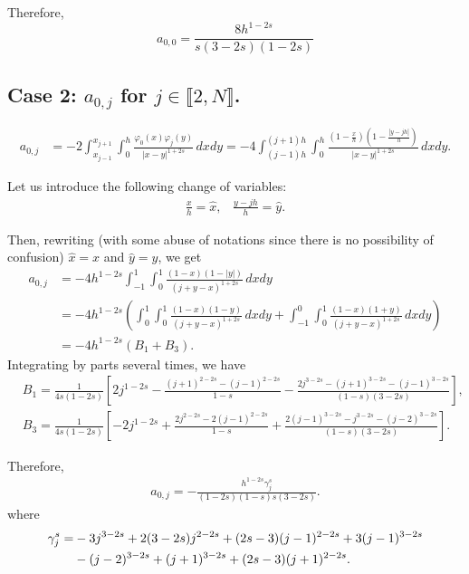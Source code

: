 \documentclass[11 pt]{article}
\newcommand\inter[1]{\llbracket #1\rrbracket}
\numberwithin{equation}{section}
\begin{document}
Therefore,
%
\begin{equation*}
    a_{0,0}=\frac{8 h^{1 - 2 s}}{s (3 - 2 s) (1 - 2 s)}
\end{equation*}
%

\subsection{Case 2: $a_{0,j}$ for $j\in\inter{2,N}$.}

\begin{align*}
	a_{0,j}&=-2 \int_{x_{j-1}}^{x_{j+1}}\int_{0}^{h}\frac{\varphi_0(x)\varphi_j(y)}{|x-y|^{1+2s}}\,dxdy
=-4 \int_{(j-1)h}^{(j+1)h}\int_0^{h}\frac{\left(1-\frac{x}{h}\right)\left(1-\frac{|y-jh|}{h}\right)}{|x-y|^{1+2s}}\,dxdy.
\end{align*}

Let us introduce the following change of variables:
\begin{align*}
	\frac{x}{h}=\hat{x},\;\;\; \frac{y-jh}{h}=\hat{y}.
\end{align*}

Then, rewriting (with some abuse of notations since there is no possibility of confusion) $\hat{x}=x$ and $\hat{y}=y$, we get 
\begin{align}\label{elem_noint_cv}
	a_{0,j}&=-4h^{1-2s} \int_{-1}^1\int_{0}^1\frac{(1-x)(1-|y|)}{(j+y-x)^{1+2s}}\,dxdy\\
	&=-4h^{1-2s} \left(\int_{0}^1\int_{0}^1\frac{(1-x)(1-y)}{(j+y-x)^{1+2s}}\,dxdy
	+\int_{-1}^0\int_{0}^1\frac{(1-x)(1+y)}{(j+y-x)^{1+2s}}\,dxdy\right)\\
	&=-4h^{1-2s}(B_1+B_3).
\end{align}
Integrating by parts several times, we have
\begin{align*}
	& B_1 = \frac{1}{4s(1-2s)}\left[2j^{1-2s}-\frac{(j+1)^{2-2s}-(j-1)^{2-2s}}{1-s}-\frac{2j^{3-2s}-(j+1)^{3-2s}-(j-1)^{3-2s}}{(1-s)(3-2s)}\right],\\
	& B_3 = \frac{1}{4s(1-2s)}\left[-2j^{1-2s}+\frac{2j^{2-2s}-2(j-1)^{2-2s}}{1-s}+\frac{2(j-1)^{3-2s}-j^{3-2s}-(j-2)^{3-2s}}{(1-s)(3-2s)}\right].
\end{align*} 

Therefore,
\begin{align*}
	a_{0,j} =-\frac{h^{1-2 s} \gamma_j^s }{(1-2 s) (1-s) s (3- 2s )}.
\end{align*} 
where
%
\begin{align}\notag
\gamma_j^s= &-3 j^{3-2 s}+2 (3-2 s) j^{2-2 s}+(2 s-3)
   (j-1)^{2-2 s}+3 (j-1)^{3-2 s} \\ \label{eq:def_gamma_j}
   &-(j-2)^{3-2 s}+(j+1)^{3-2 s}+(2
   s-3) (j+1)^{2-2 s}.
\end{align}
%
\end{document}
